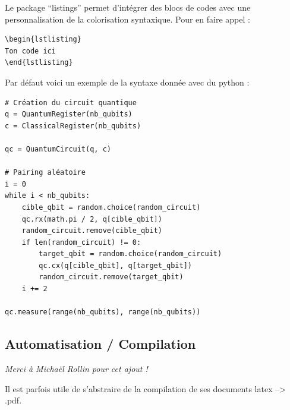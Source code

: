 \noindent Le package ``listings'' permet d'intégrer des blocs de codes avec une personnalisation de la colorisation syntaxique. Pour en faire appel :
{\small \begin{verbatim}
\begin{lstlisting}
Ton code ici
\end{lstlisting}
\end{verbatim}}
\noindent Par défaut voici un exemple de la syntaxe donnée avec du python :
\begin{lstlisting}
# Création du circuit quantique
q = QuantumRegister(nb_qubits)
c = ClassicalRegister(nb_qubits)

qc = QuantumCircuit(q, c)

# Pairing aléatoire
i = 0
while i < nb_qubits:
    cible_qbit = random.choice(random_circuit)
    qc.rx(math.pi / 2, q[cible_qbit])
    random_circuit.remove(cible_qbit)
    if len(random_circuit) != 0:
        target_qbit = random.choice(random_circuit)
        qc.cx(q[cible_qbit], q[target_qbit])
        random_circuit.remove(target_qbit)
    i += 2

qc.measure(range(nb_qubits), range(nb_qubits))
\end{lstlisting}

\subsection{Automatisation / Compilation}
\label{chap1:sec:exemple_compilation}

\noindent\textit{Merci à Michaël Rollin pour cet ajout !}\bigskip

Il est parfois utile de s'abstraire de la compilation de ses documents latex --> .pdf.\bigskip

